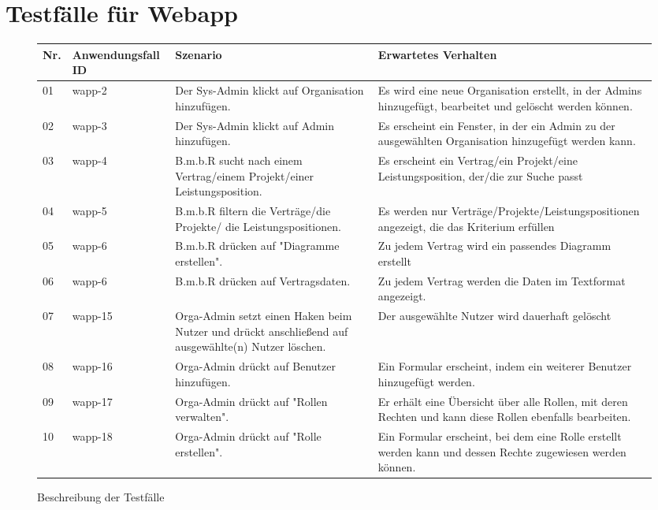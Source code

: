\section{Testfälle für Webapp}
\begin{figure}[!h]
	\begin{center}
		\begin{tabularx}{\textwidth}{ p{} | p{} | p{} | X }
			\textbf{Nr.} & \textbf{Anwendungsfall ID} & \textbf{Szenario} & \textbf{Erwartetes Verhalten} \\ \hline
			01 & wapp-2 & Der Sys-Admin klickt auf Organisation hinzufügen. & Es wird eine neue Organisation erstellt, in der Admins hinzugefügt, bearbeitet und gelöscht werden können. \\ \hline
			02 & wapp-3 & Der Sys-Admin klickt auf Admin hinzufügen. & Es erscheint ein Fenster, in der ein Admin zu der ausgewählten Organisation hinzugefügt werden kann. \\ \hline
			03 & wapp-4 & B.m.b.R sucht nach einem Vertrag/einem Projekt/einer Leistungsposition. & Es erscheint ein Vertrag/ein Projekt/eine Leistungsposition, der/die zur Suche passt \\ \hline
			04 & wapp-5 & B.m.b.R filtern die Verträge/die Projekte/ die Leistungspositionen. & Es werden nur Verträge/Projekte/Leistungspositionen angezeigt, die das Kriterium erfüllen \\ \hline
			05 & wapp-6 & B.m.b.R drücken auf "Diagramme erstellen". & Zu jedem Vertrag wird ein passendes Diagramm erstellt \\ \hline
			06 & wapp-6 & B.m.b.R drücken auf Vertragsdaten. & Zu jedem Vertrag werden die Daten im Textformat angezeigt. \\ \hline 
			07& wapp-15 & Orga-Admin setzt einen Haken beim Nutzer und drückt anschließend auf ausgewählte(n) Nutzer löschen. & Der ausgewählte Nutzer wird dauerhaft gelöscht \\ \hline
			08 & wapp-16 & Orga-Admin drückt auf Benutzer hinzufügen. & Ein Formular erscheint, indem ein weiterer Benutzer hinzugefügt werden. \\ \hline
			09 & wapp-17 & Orga-Admin drückt auf "Rollen verwalten". & Er erhält eine Übersicht über alle Rollen, mit deren Rechten und kann diese Rollen ebenfalls bearbeiten. \\ \hline
			10 & wapp-18 & Orga-Admin drückt auf "Rolle erstellen". & Ein Formular erscheint, bei dem eine Rolle erstellt werden kann und dessen Rechte zugewiesen werden können. \\ \hline
		\end{tabularx}	
	\end{center}
	\caption{Beschreibung der Testfälle}
	\label{fig:testfaelle-web-app-tabelle}
\end{figure}

